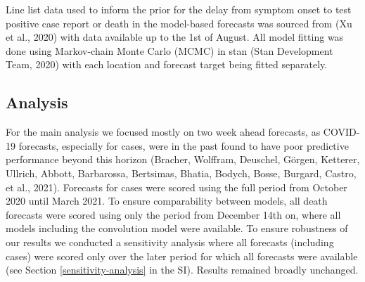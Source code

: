 \documentclass[
]{article}
\begin{document}
Line list data used to inform the prior for the delay from symptom onset to test positive case report or death in the model-based forecasts was sourced from (Xu et al., 2020) with data available up to the 1st of August. All model fitting was done using Markov-chain Monte Carlo (MCMC) in stan (Stan Development Team, 2020) with each location and forecast target being fitted separately.

\hypertarget{analysis}{%
\subsection{Analysis}\label{analysis}}

For the main analysis we focused mostly on two week ahead forecasts, as COVID-19 forecasts, especially for cases, were in the past found to have poor predictive performance beyond this horizon (Bracher, Wolffram, Deuschel, Görgen, Ketterer, Ullrich, Abbott, Barbarossa, Bertsimas, Bhatia, Bodych, Bosse, Burgard, Castro, et al., 2021). Forecasts for cases were scored using the full period from October 2020 until March 2021. To ensure comparability between models, all death forecasts were scored using only the period from December 14th on, where all models including the convolution model were available. To ensure robustness of our results we conducted a sensitivity analysis where all forecasts (including cases) were scored only over the later period for which all forecasts were available (see Section \ref{sensitivity-analysis} in the SI). Results remained broadly unchanged.
\end{document}

